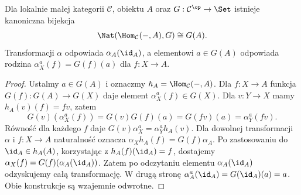 \begin{twierdzenie}\label{cat:thm:yoneda-contra}
Dla lokalnie małej kategorii $\mathcal C$, obiektu $A$ oraz $G:\mathcal C^{\op}\to\Set$ istnieje kanoniczna bijekcja
\[
\Nat(\Hom_{\mathcal C}(-,A),G)\cong G(A).
\]
Transformacji $\alpha$ odpowiada $\alpha_A(\id_A)$, a elementowi $a\in G(A)$ odpowiada rodzina $\alpha^a_X(f)=G(f)(a)$ dla $f:X\to A$.
\end{twierdzenie}
\begin{proof}
Ustalmy $a\in G(A)$ i oznaczmy $h_A=\Hom_{\mathcal C}(-,A)$. Dla $f:X\to A$ funkcja $G(f):G(A)\to G(X)$ daje element $\alpha^a_X(f)\in G(X)$. Dla $v:Y\to X$ mamy $h_A(v)(f)=fv$, zatem
\[
G(v)(\alpha^a_X(f))=G(v)G(f)(a)
=G(fv)(a)=\alpha^a_Y(fv).
\]
Równość dla każdego $f$ daje $G(v)\alpha^a_X=\alpha^a_Y h_A(v)$. Dla dowolnej transformacji $\alpha$ i $f:X\to A$ naturalność oznacza $\alpha_X h_A(f)=G(f)\alpha_A$. Po zastosowaniu do $\id_A\in h_A(A)$, korzystając z $h_A(f)(\id_A)=f$, dostajemy
$\alpha_X(f)=G(f)(\alpha_A(\id_A))$. Zatem po odczytaniu elementu $\alpha_A(\id_A)$ odzyskujemy całą transformację. W drugą stronę $\alpha^a_A(\id_A)=G(\id_A)(a)=a$. Obie konstrukcje są wzajemnie odwrotne.
\end{proof}

